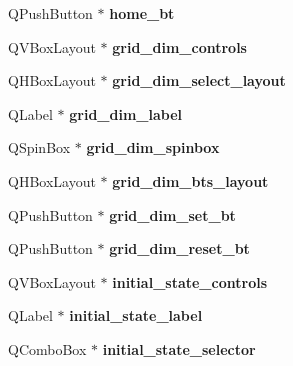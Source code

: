 \begin{DoxyCompactItemize}
Q\+Push\+Button $\ast$ {\bfseries home\+\_\+bt}
\item 
\mbox{\label{class_simulator_interface_a5a474d21a7ba81895ded91674048b87b}} 
Q\+V\+Box\+Layout $\ast$ {\bfseries grid\+\_\+dim\+\_\+controls}
\item 
\mbox{\label{class_simulator_interface_a2ae3206c24171e5fa4a7d332b377a59c}} 
Q\+H\+Box\+Layout $\ast$ {\bfseries grid\+\_\+dim\+\_\+select\+\_\+layout}
\item 
\mbox{\label{class_simulator_interface_adf3f6ff5393479c8db6528ff5f7a3051}} 
Q\+Label $\ast$ {\bfseries grid\+\_\+dim\+\_\+label}
\item 
\mbox{\label{class_simulator_interface_ad68f3bc82cfade236803d10b1601b077}} 
Q\+Spin\+Box $\ast$ {\bfseries grid\+\_\+dim\+\_\+spinbox}
\item 
\mbox{\label{class_simulator_interface_a518ed9946e5506276132af49c52b66d6}} 
Q\+H\+Box\+Layout $\ast$ {\bfseries grid\+\_\+dim\+\_\+bts\+\_\+layout}
\item 
\mbox{\label{class_simulator_interface_a7c5213fe1673e997089bc371191a7c43}} 
Q\+Push\+Button $\ast$ {\bfseries grid\+\_\+dim\+\_\+set\+\_\+bt}
\item 
\mbox{\label{class_simulator_interface_a2c86544815543133e33386f4b3448438}} 
Q\+Push\+Button $\ast$ {\bfseries grid\+\_\+dim\+\_\+reset\+\_\+bt}
\item 
\mbox{\label{class_simulator_interface_a2a361b5bf03a891e629a877740a1b13b}} 
Q\+V\+Box\+Layout $\ast$ {\bfseries initial\+\_\+state\+\_\+controls}
\item 
\mbox{\label{class_simulator_interface_a3db4cd7fa3917aea1bfc0911fe28a413}} 
Q\+Label $\ast$ {\bfseries initial\+\_\+state\+\_\+label}
\item 
\mbox{\label{class_simulator_interface_a76e79eb8d0a6936437b0916eb9d049ca}} 
Q\+Combo\+Box $\ast$ {\bfseries initial\+\_\+state\+\_\+selector}

\end{DoxyCompactItemize}
